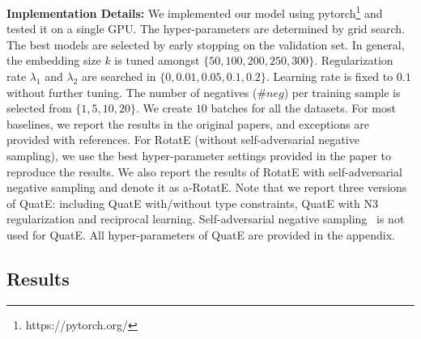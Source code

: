\documentclass{article}
\begin{document}
\textbf{Implementation Details:} We implemented our model using pytorch\footnote{https://pytorch.org/} and tested it on a single GPU. The hyper-parameters are determined by grid search. The best models are selected by early stopping on the validation set. In general, the embedding size $k$ is tuned amongst $\{50, 100, 200, 250, 300\}$. Regularization rate $\lambda_1$ and $\lambda_2$ are searched in $\{0, 0.01, 0.05, 0.1, 0.2\}$. Learning rate is fixed to $0.1$ without further tuning. The number of negatives ($\#neg$) per training sample is selected from $\{1, 5, 10, 20\}$. We create $10$ batches for all the datasets. For most baselines, we report the results in the original papers, and exceptions are provided with references. For RotatE (without self-adversarial negative sampling), we use the best hyper-parameter settings provided in the paper to reproduce the results. We also report the results of RotatE with self-adversarial negative sampling and denote it as a-RotatE. Note that we report three versions of QuatE: including QuatE with/without type constraints, QuatE with N3 regularization and reciprocal learning. Self-adversarial negative sampling~\citep{sun2019rotate} is not used for QuatE. All hyper-parameters of QuatE are provided in the appendix.

\subsection{Results}
\end{document}
